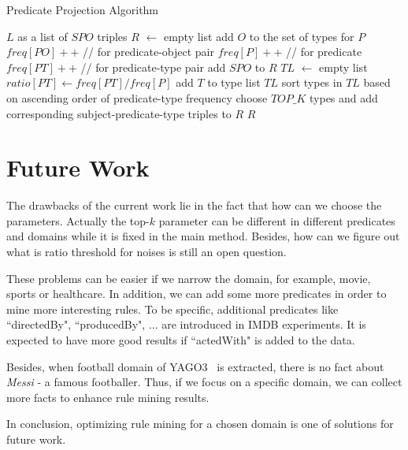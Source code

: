 \documentclass{acm_proc_article-sp}
\begin{document}
\begin{algorithm}[ht]
\caption{Predicate Projection Algorithm}
\label{algo1}
\begin{algorithmic}
\REQUIRE $L$ as a list of $SPO$ triples
\STATE $R$ $\leftarrow$ empty list
\STATE add $O$ to the set of types for $P$
\ENDIF
\STATE $freq[PO]++$  //  for predicate-object pair
\STATE $freq[P]++$  //  for predicate
\ENDFOR
\STATE
{}
\STATE $freq[PT]++$  //  for predicate-type pair
\ENDFOR
\ENDFOR
\STATE
{}
\STATE add $SPO$ to $R$
\ENDIF
\STATE
\STATE $TL$ $\leftarrow$ empty list
\STATE $ratio[PT] \leftarrow freq[PT] / freq[P]$
\STATE add $T$ to type list $TL$
\ENDIF
\ENDFOR
\STATE sort types in $TL$ based on ascending order of predicate-type frequency
\STATE choose $TOP\_K$ types and add corresponding subject-predicate-type triples to $R$
\ENDFOR
\STATE
\RETURN $R$
\end{algorithmic}
\end{algorithm}

\section{Future Work}

The drawbacks of the current work lie in the fact that how can we choose the parameters. Actually the top-$k$ parameter can be different in different predicates and domains while it is fixed in the main method. Besides, how can we figure out what is ratio threshold for noises is still an open question.

These problems can be easier if we narrow the domain, for example, movie, sports or healthcare. In addition, we can add some more predicates in order to mine more interesting rules. To be specific, additional predicates like ``directedBy", ``producedBy", ... are introduced in IMDB experiments. It is expected to have more good results if ``actedWith" is added to the data.

Besides, when football domain of YAGO3~\cite{ref1} is extracted, there is no fact about \textit{Messi} - a famous footballer. Thus, if we focus on a specific domain, we can collect more facts to enhance rule mining results.

In conclusion, optimizing rule mining for a chosen domain is one of solutions for future work.



\end{document}
